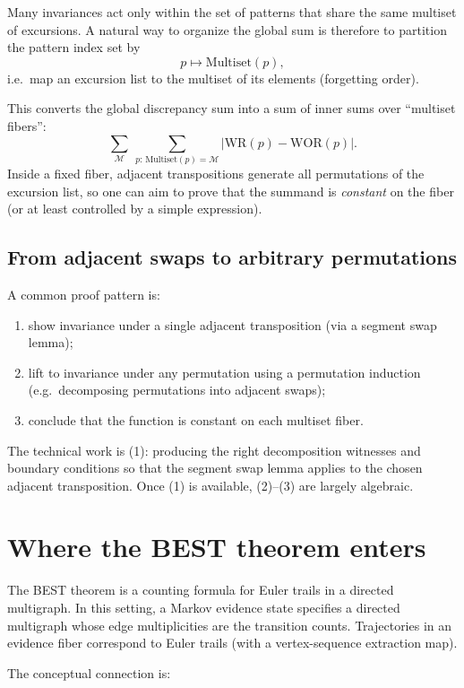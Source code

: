 \documentclass[11pt]{article}
\begin{document}
Many invariances act only within the set of patterns that share the same multiset of excursions.
A natural way to organize the global sum is therefore to partition the pattern index set by
\[
p \longmapsto \mathrm{Multiset}(p),
\]
i.e.\ map an excursion list to the multiset of its elements (forgetting order).

This converts the global discrepancy sum into a sum of inner sums over ``multiset fibers'':
\[
\sum_{\mathcal{M}} \ \sum_{p:\,\mathrm{Multiset}(p)=\mathcal{M}} \big|\mathrm{WR}(p)-\mathrm{WOR}(p)\big|.
\]
Inside a fixed fiber, adjacent transpositions generate all permutations of the excursion list, so
one can aim to prove that the summand is \emph{constant} on the fiber (or at least controlled by a
simple expression).

\subsection{From adjacent swaps to arbitrary permutations}

A common proof pattern is:

\begin{enumerate}
\item show invariance under a single adjacent transposition (via a segment swap lemma);
\item lift to invariance under any permutation using a permutation induction
(e.g.\ decomposing permutations into adjacent swaps);
\item conclude that the function is constant on each multiset fiber.
\end{enumerate}

The technical work is (1): producing the right decomposition witnesses and boundary conditions so
that the segment swap lemma applies to the chosen adjacent transposition. Once (1) is available,
(2)--(3) are largely algebraic.

\section{Where the BEST theorem enters}

The BEST theorem is a counting formula for Euler trails in a directed multigraph.
In this setting, a Markov evidence state specifies a directed multigraph whose edge multiplicities
are the transition counts. Trajectories in an evidence fiber correspond to Euler trails (with a
vertex-sequence extraction map).

The conceptual connection is:
\end{document}
